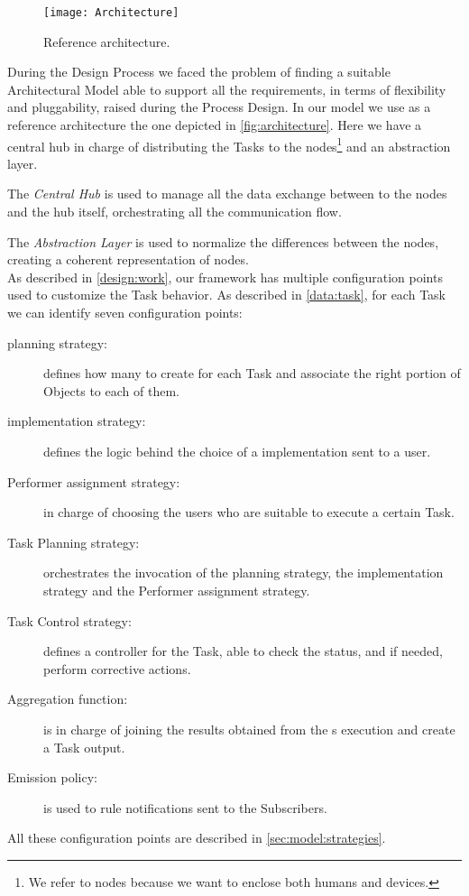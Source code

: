 \begin{figure}[htb]
	\centering
	\texttt{[image: Architecture]}
	\caption{Reference architecture.}
	\label{fig:architecture}
\end{figure}


During the Design Process we faced the problem of finding a suitable Architectural
Model able to support all the requirements, in terms of flexibility and pluggability,
raised during the Process Design. In our model we use as a reference architecture
the one depicted in \autoref{fig:architecture}. Here we have a central hub
in charge of distributing the Tasks to the nodes\footnote{We refer to nodes
because we want to enclose both humans and devices.} and an abstraction layer.

The \emph{Central Hub} is used to manage all the data exchange between to the
nodes and the hub itself, orchestrating all the communication flow.

The \emph{Abstraction Layer} is used to normalize the differences between the
nodes, creating a coherent representation of nodes.\\




As described in \ref{design:work}, our framework has multiple configuration
points used to customize the Task behavior. As described in \vref{data:task},
for each Task we can identify seven configuration points:
\begin{description}
	\item[\utask{} planning strategy:] defines how many \utask{} to create for
	each Task and associate the right portion of Objects to each of them.
	\item[\utask{} implementation strategy:] defines the logic behind the choice
	of a \utask{} implementation sent to a user.
	\item[Performer assignment strategy:] in charge of choosing the users who
	are suitable to execute a certain Task.
	\item[Task Planning strategy:] orchestrates the invocation of the \utask{}
	planning strategy, the \utask{} implementation strategy and the Performer
	assignment strategy.
	\item[Task Control strategy:] defines a controller for the Task, able to
	check the status, and if needed, perform corrective actions.
	\item[Aggregation function:] is in charge of joining the results obtained
	from the \utask{}s execution and create a Task output.
	\item[Emission policy:] is used to rule notifications sent to the Subscribers.
\end{description}
All these configuration points are described in \ref{sec:model:strategies}.